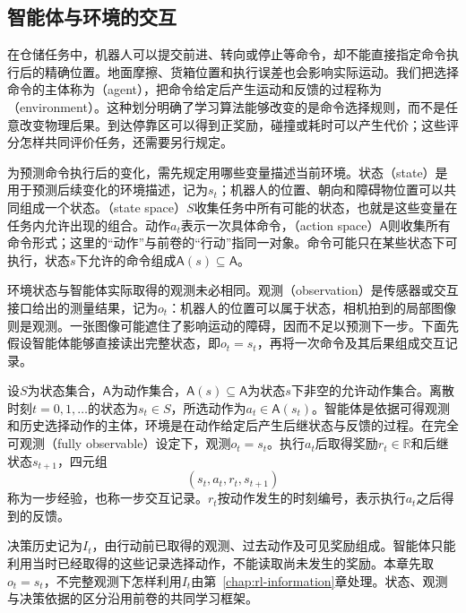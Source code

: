 \subsection{智能体与环境的交互}
\label{sec:rl-overview-interaction}

在仓储任务中，机器人可以提交前进、转向或停止等命令，却不能直接指定命令执行后的精确位置。地面摩擦、货箱位置和执行误差也会影响实际运动。我们把选择命令的主体称为（agent），把命令给定后产生运动和反馈的过程称为（environment）。这种划分明确了学习算法能够改变的是命令选择规则，而不是任意改变物理后果。到达停靠区可以得到正奖励，碰撞或耗时可以产生代价；这些评分怎样共同评价任务，还需要另行规定。

为预测命令执行后的变化，需先规定用哪些变量描述当前环境。状态（state）是用于预测后续变化的环境描述，记为$s_t$；机器人的位置、朝向和障碍物位置可以共同组成一个状态。（state space）$S$收集任务中所有可能的状态，也就是这些变量在任务内允许出现的组合。动作$a_t$表示一次具体命令，（action space）$\mathsf A$则收集所有命令形式；这里的“动作”与前卷的“行动”指同一对象。命令可能只在某些状态下可执行，状态$s$下允许的命令组成$\mathsf A(s)\subseteq\mathsf A$。

环境状态与智能体实际取得的观测未必相同。观测（observation）是传感器或交互接口给出的测量结果，记为$o_t$：机器人的位置可以属于状态，相机拍到的局部图像则是观测。一张图像可能遮住了影响运动的障碍，因而不足以预测下一步。下面先假设智能体能够直接读出完整状态，即$o_t=s_t$，再将一次命令及其后果组成交互记录。

\begin{definition}
  \label{def:rl-overview-interface}
  设$S$为状态集合，$\mathsf A$为动作集合，$\mathsf A(s)\subseteq\mathsf A$为状态$s$下非空的允许动作集合。离散时刻$t=0,1,\ldots$的状态为$s_t\in S$，所选动作为$a_t\in\mathsf A(s_t)$。智能体是依据可得观测和历史选择动作的主体，环境是在动作给定后产生后继状态与反馈的过程。在完全可观测（fully observable）设定下，观测$o_t=s_t$。执行$a_t$后取得奖励$r_t\in\mathbb R$和后继状态$s_{t+1}$，四元组
  \[
    (s_t,a_t,r_t,s_{t+1})
  \]
  称为一步经验，也称一步交互记录。$r_t$按动作发生的时刻编号，表示执行$a_t$之后得到的反馈。
\end{definition}

决策历史记为$I_t$，由行动前已取得的观测、过去动作及可见奖励组成。智能体只能利用当时已经取得的这些记录选择动作，不能读取尚未发生的奖励。本章先取$o_t=s_t$，不完整观测下怎样利用$I_t$由第~\ref{chap:rl-information}章处理。状态、观测与决策依据的区分沿用前卷的共同学习框架。

